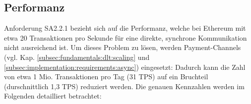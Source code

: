 \subsection{Performanz}
\label{subsec:implementation:requirements:performance}
Anforderung SA2.2.1 bezieht sich auf die Performanz, welche bei Ethereum mit etwa 20 Transaktionen pro Sekunde für eine direkte, synchrone Kommunikation nicht ausreichend ist. Um dieses Problem zu lösen, werden Payment-Channels (vgl. Kap. \ref{subsec:fundamentals:dlt:scaling} und \ref{subsec:implementation:requirements:async}) eingesetzt: Dadurch kann die Zahl von etwa 1 Mio. Transaktionen pro Tag (31 \ac{TPS}) auf ein Bruchteil (durschnittlich 1,3 \ac{TPS}) reduziert werden. Die genauen Kennzahlen werden im Folgenden detailliert betrachtet:\\

